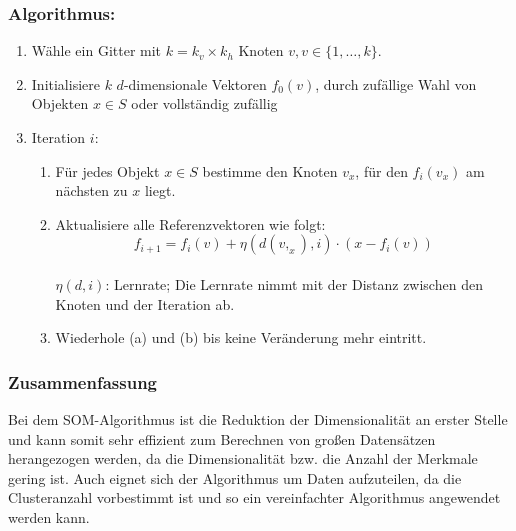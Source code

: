 \subsubsection{Algorithmus:}

\begin{enumerate}
	\item Wähle ein Gitter mit \(k = k_v \times k_h\) Knoten \(v,v \in \{1,\dotsc,k\}\).\\
	
	\item Initialisiere \(k\) \(d\)-dimensionale Vektoren \(f_0(v)\), durch zufällige Wahl von Objekten \(x \in S\) oder vollständig zufällig\\
	
	\item Iteration \(i\):
	\begin{enumerate}
		\item Für jedes Objekt \(x \in S\) bestimme den Knoten \(v_x\), für den \(f_i(v_x)\) am nächsten zu \(x\) liegt.\\
		
		\item Aktualisiere alle Referenzvektoren wie folgt:\\
		
		\[f_{i+1} = f_i(v) + \eta(d(v,_x),i) \cdot (x - f_i(v)) \]\\
		
		\(\eta(d,i)\): Lernrate; Die Lernrate nimmt mit der Distanz zwischen den Knoten und der Iteration ab.\\
		\item Wiederhole (a) und (b) bis keine Veränderung mehr eintritt.\\
	\end{enumerate} 
\end{enumerate}
\cite{tam99}
\subsubsection{Zusammenfassung}
Bei dem SOM-Algorithmus ist die Reduktion der Dimensionalität an erster Stelle und kann somit sehr effizient zum Berechnen von großen Datensätzen herangezogen werden, da die Dimensionalität bzw. die Anzahl der Merkmale gering ist. Auch eignet sich der Algorithmus um Daten aufzuteilen, da die Clusteranzahl vorbestimmt ist und so ein vereinfachter Algorithmus angewendet werden kann. 

